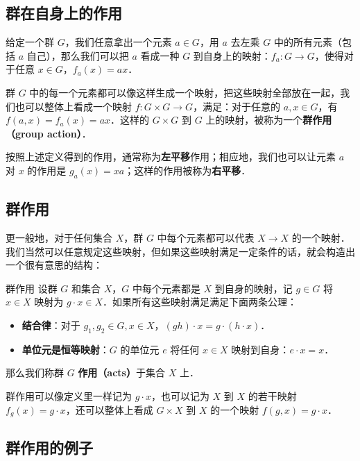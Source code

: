 
\subsection{群在自身上的作用}

给定一个群 $G$，我们任意拿出一个元素 $a\in G$，用 $a$ 去左乘 $G$ 中的所有元素（包括 $a$ 自己），那么我们可以把 $a$ 看成一种 $G$ 到自身上的映射：$f_a:G\rightarrow G$，使得对于任意 $x\in G$，$f_a(x)=ax$．

群 $G$ 中的每一个元素都可以像这样生成一个映射，把这些映射全部放在一起，我们也可以整体上看成一个映射 $f:G\times G\rightarrow G$，满足：对于任意的 $a, x\in G$，有 $f(a,x)=f_a(x)=ax$．这样的 $G\times G$ 到 $G$ 上的映射，被称为一个\textbf{群作用（group action）}．

按照上述定义得到的作用，通常称为\textbf{左平移}作用；相应地，我们也可以让元素 $a$ 对 $x$ 的作用是 $g_a(x)=xa$；这样的作用被称为\textbf{右平移}．

\subsection{群作用}

更一般地，对于任何集合 $X$，群 $G$ 中每个元素都可以代表 $X\rightarrow X$ 的一个映射．我们当然可以任意规定这些映射，但如果这些映射满足一定条件的话，就会构造出一个很有意思的结构：

\begin{definition}{群作用}
设群 $G$ 和集合 $X$，$G$ 中每个元素都是 $X$ 到自身的映射，记 $g\in G$ 将 $x\in X$ 映射为 $g\cdot x\in X$．如果所有这些映射满足满足下面两条公理：
\begin{itemize}
\item \textbf{结合律}：对于 $g_1, g_2\in G, x\in X$，$(gh)\cdot x=g\cdot (h\cdot x)$．
\item \textbf{单位元是恒等映射}：$G$ 的单位元 $e$ 将任何 $x\in X$ 映射到自身：$e\cdot x=x$．
\end{itemize}

那么我们称群 $G$ \textbf{作用（acts）}于集合 $X$ 上．

\end{definition}

群作用可以像定义里一样记为 $g\cdot x$，也可以记为 $X$ 到 $X$ 的若干映射 $f_g(x)=g\cdot x$，还可以整体上看成 $G\times X$ 到 $X$ 的一个映射 $f(g, x)=g\cdot x$．

\subsection{群作用的例子}

